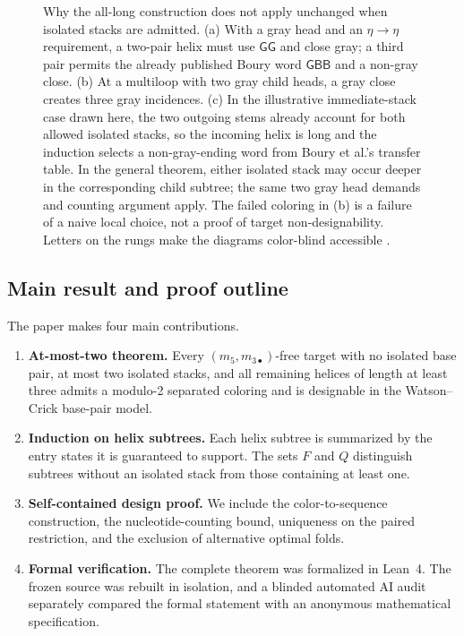 \documentclass[11pt]{article}
\newcommand{\Bcol}{\mathsf{B}}
\newcommand{\Gray}{\mathsf{G}}
\begin{document}
\begin{figure}[t]
\caption{Why the all-long construction does not apply unchanged when isolated stacks are admitted.  (a) With a gray head and an $\eta\to\eta$ requirement, a two-pair helix must use $\Gray\Gray$ and close gray; a third pair permits the already published Boury word $\Gray\Bcol\Bcol$ and a non-gray close.  (b) At a multiloop with two gray child heads, a gray close creates three gray incidences.  (c) In the illustrative immediate-stack case drawn here, the two outgoing stems already account for both allowed isolated stacks, so the incoming helix is long and the induction selects a non-gray-ending word from Boury et al.'s transfer table.  In the general theorem, either isolated stack may occur deeper in the corresponding child subtree; the same two gray head demands and counting argument apply.  The failed coloring in (b) is a failure of a naive local choice, not a proof of target non-designability.  Letters on the rungs make the diagrams color-blind accessible \citep{boury2024,boury2025}.}
\label{fig:boury-gap}
\end{figure}

\subsection{Main result and proof outline}

\begin{contributionbox}
The paper makes four main contributions.
\begin{enumerate}
\item \textbf{At-most-two theorem.}  Every $(m_5,m_{3\bullet})$-free target with no isolated base pair, at most two isolated stacks, and all remaining helices of length at least three admits a modulo-2 separated coloring and is designable in the Watson--Crick base-pair model.
\item \textbf{Induction on helix subtrees.}  Each helix subtree is summarized by the entry states it is guaranteed to support.  The sets $F$ and $Q$ distinguish subtrees without an isolated stack from those containing at least one.
\item \textbf{Self-contained design proof.}  We include the color-to-sequence construction, the nucleotide-counting bound, uniqueness on the paired restriction, and the exclusion of alternative optimal folds.
\item \textbf{Formal verification.}  The complete theorem was formalized in Lean~4.  The frozen source was rebuilt in isolation, and a blinded automated AI audit separately compared the formal statement with an anonymous mathematical specification.
\end{enumerate}
\end{contributionbox}
\end{document}
